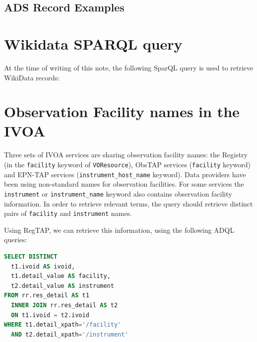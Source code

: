 \documentclass[11pt,a4paper]{ivoa}
\begin{document}
\subsection{ADS Record Examples}

\section{Wikidata SPARQL query}
\label{appendix:sparql}
At the time of writing of this note, the following SparQL query
is used to retrieve WikiData records:  
{\tiny

}
 
\section{Observation Facility names in the IVOA}

Three sets of IVOA services are sharing observation facility names: 
the Registry (in the \texttt{facility} keyword of \texttt{VOResource}), 
ObsTAP services (\texttt{facility} keyword) and EPN-TAP services 
(\texttt{instrument\_host\_name} keyword). Data providers have been 
using non-standard names for observation facilities. For some services 
the \texttt{instrument} or \texttt{instrument\_name} keyword also contains 
observation facility information. In order to retrieve relevant terms, the 
query should retrieve distinct pairs of  \texttt{facility}  and  
\texttt{instrument} names.

Using RegTAP, we can retrieve this information, using the following ADQL queries:

\begin{lstlisting}[language=SQL]
SELECT DISTINCT 
  t1.ivoid AS ivoid, 
  t1.detail_value AS facility, 
  t2.detail_value AS instrument 
FROM rr.res_detail AS t1 
  INNER JOIN rr.res_detail AS t2 
  ON t1.ivoid = t2.ivoid 
WHERE t1.detail_xpath='/facility' 
  AND t2.detail_xpath='/instrument'
\end{lstlisting}
\end{document}
